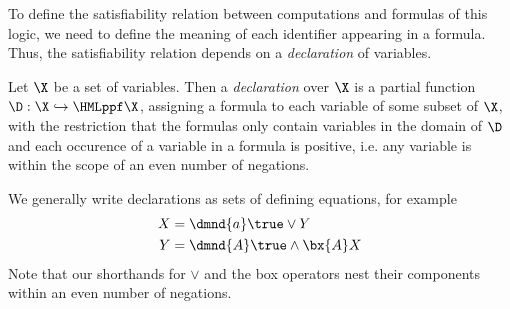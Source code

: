 To define the satisfiability relation between computations and formulas
of this logic, we need to define the meaning of each identifier appearing
in a formula. Thus, the satisfiability relation depends on a {\em declaration}
of variables.
\begin{definition}
    Let $\X$ be a set of variables. Then 
    a {\em declaration} over $\X$ is a partial function 
    $\D : \X \hookrightarrow \HMLppf\X$,
    assigning a formula to each variable of some subset of $\X$, with the restriction
    that the formulas only contain variables in the domain of $\D$ and each occurence
    of a variable in a formula is positive, i.e. any variable is within the scope of
    an even number of negations.
\end{definition}
%
We generally write declarations as sets of defining equations, for example
\begin{align*}
    X &= \dmnd{a}\true \lor Y \\
    Y &= \dmnd{A}\true \land \bx{A}X
\end{align*}
Note that our shorthands for $\lor$ and the box operators nest their components within
an even number of negations.

